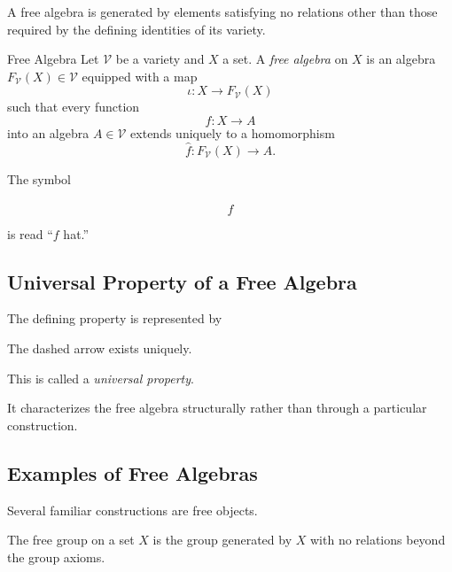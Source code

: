 A free algebra is generated by elements satisfying no relations other than
those required by the defining identities of its variety.

\begin{definitionbox}{Free Algebra}
Let \(\mathcal V\) be a variety and \(X\) a set. A \emph{free algebra} on
\(X\) is an algebra \(F_{\mathcal V}(X)\in\mathcal V\) equipped with a map
\[ \iota:X\to F_{\mathcal V}(X) \]
such that every function
\[ f:X\to A \]
into an algebra \(A\in\mathcal V\) extends uniquely to a homomorphism
\[ \widehat f:F_{\mathcal V}(X)\to A. \]
\end{definitionbox}

The symbol

\[ \widehat f \]

is read ``\(f\) hat.''

\subsection{Universal Property of a Free Algebra}
\label{subsec:free-algebra-universal-property}

The defining property is represented by

\begin{center}
\end{center}

The dashed arrow exists uniquely.

This is called a \emph{universal property}.

It characterizes the free algebra structurally rather than through a
particular construction.

\subsection{Examples of Free Algebras}
\label{subsec:free-algebra-examples}

Several familiar constructions are free objects.

The free group on a set \(X\) is the group generated by \(X\) with no
relations beyond the group axioms.

